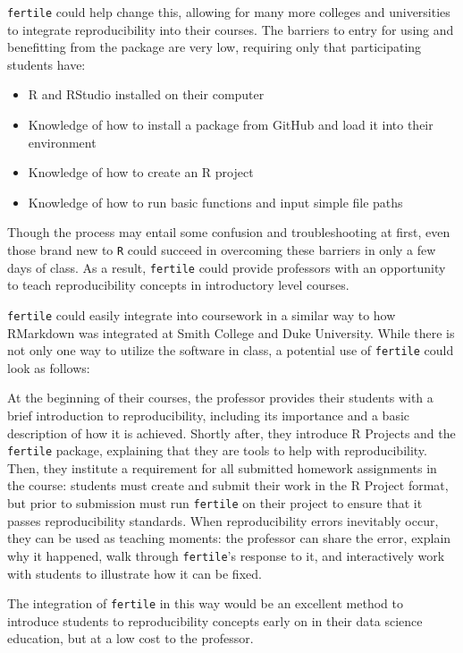 \documentclass[12pt,twoside]{reedthesis}
\providecommand{\tightlist}{%
  \setlength{\itemsep}{0pt}\setlength{\parskip}{0pt}}
\begin{document}
\texttt{fertile} could help change this, allowing for many more colleges
and universities to integrate reproducibility into their courses. The
barriers to entry for using and benefitting from the package are very
low, requiring only that participating students have:
\begin{itemize}
\tightlist
\item
  R and RStudio installed on their computer
\item
  Knowledge of how to install a package from GitHub and load it into
  their environment
\item
  Knowledge of how to create an R project
\item
  Knowledge of how to run basic functions and input simple file paths
\end{itemize}
Though the process may entail some confusion and troubleshooting at
first, even those brand new to \texttt{R} could succeed in overcoming
these barriers in only a few days of class. As a result,
\texttt{fertile} could provide professors with an opportunity to teach
reproducibility concepts in introductory level courses.

\texttt{fertile} could easily integrate into coursework in a similar way
to how RMarkdown was integrated at Smith College and Duke University.
While there is not only one way to utilize the software in class, a
potential use of \texttt{fertile} could look as follows:

At the beginning of their courses, the professor provides their students
with a brief introduction to reproducibility, including its importance
and a basic description of how it is achieved. Shortly after, they
introduce R Projects and the \texttt{fertile} package, explaining that
they are tools to help with reproducibility. Then, they institute a
requirement for all submitted homework assignments in the course:
students must create and submit their work in the R Project format, but
prior to submission must run \texttt{fertile} on their project to ensure
that it passes reproducibility standards. When reproducibility errors
inevitably occur, they can be used as teaching moments: the professor
can share the error, explain why it happened, walk through
\texttt{fertile}'s response to it, and interactively work with students
to illustrate how it can be fixed.

The integration of \texttt{fertile} in this way would be an excellent
method to introduce students to reproducibility concepts early on in
their data science education, but at a low cost to the professor.
\end{document}
